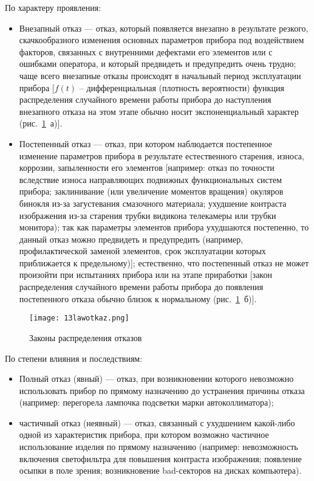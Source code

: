 По характеру проявления:
\begin{itemize}
\item Внезапный отказ --- отказ, который появляется внезапно в результате резкого, скачкообразного изменения основных параметров прибора под воздействием факторов, связанных с внутренними дефектами его элементов или с ошибками оператора, и который предвидеть и предупредить очень трудно; чаще всего внезапные отказы происходят в начальный период эксплуатации прибора [$ f(t) $ -- дифференциальная (плотность вероятности) функция распределения случайного времени работы прибора до наступления внезапного отказа на этом этапе обычно носит экспоненциальный характер (рис.~\ref{pic:13lawotkaz}~а)].
\item Постепенный отказ --- отказ, при котором наблюдается постепенное изменение параметров прибора в результате естественного старения, износа, коррозии, запыленности его элементов [например: отказ по точности вследствие износа направляющих подвижных функциональных систем прибора; заклинивание (или увеличение моментов вращения) окуляров бинокля из-за загустевания смазочного материала; ухудшение контраста изображения из-за старения трубки видикона телекамеры или трубки монитора); так как параметры элементов прибора ухудшаются постепенно, то данный отказ можно предвидеть и предупредить (например, профилактической заменой элементов, срок эксплуатации которых приближается к предельному)]; естественно, что постепенный отказ не может произойти при испытаниях прибора или на этапе приработки [закон распределения случайного времени работы прибора до появления постепенного отказа обычно близок к нормальному (рис.~\ref{pic:13lawotkaz}~б)].
\end{itemize}
 
\begin{figure}[h!]
	\caption{ Законы распределения отказов }
	\texttt{[image: 13lawotkaz.png]}
	\label{pic:13lawotkaz}
\end{figure}

По степени влияния и последствиям:
\begin{itemize}
\item Полный отказ (явный) --- отказ, при возникновении которого невозможно использовать прибор по прямому назначению до устранения причины отказа (например: перегорела лампочка подсветки марки автоколлиматора);
\item частичный отказ (неявный) --- отказ, связанный с ухудшением какой-либо одной из характеристик прибора, при котором возможно частичное использование изделия по прямому назначению (например: невозможность включения светофильтра для повышения контраста изображения; появление осыпки в поле зрения; возникновение bad-секторов на дисках компьютера).
\end{itemize}

